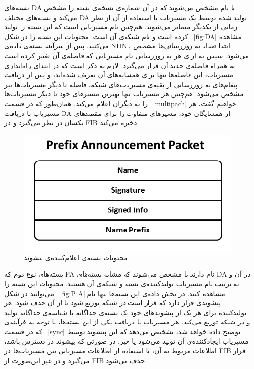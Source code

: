 بسته‌های DA با نام  مشخص می‌شوند که در آن  شماره‌ی نسخه‌ی بسته را مشخص می‌کند و بسته‌های مختلف DA تولید شده توسط یک مسیریاب با استفاده از آن از نظر زمانی از یکدیگر متمایز می‌شوند. هم‌چنین  نام مسیریابی است که این بسته را تولید کرده است و  نام شبکه‌ی آن است. محتویات این بسته را در شکل ~\ref{fig:DA} مشاهده می‌کنید. پس از سرآیند بسته‌ی داده‌ی NDN ، ابتدا تعداد به روزرسانی‌ها مشخص می‌شود. سپس به ازای هر به روزرسانی نام مسیریابی که فاصله‌ی آن تغییر کرده است به همراه فاصله‌ی جدید آن قرار می‌گیرد. لازم به ذکر است که در ابتدای راه‌اندازی مسیریاب، این فاصله‌ها تنها برای همسایه‌های آن تعریف شده‌اند، و پس از دریافت پیغام‌های به روزرسانی از بقیه‌ی مسیریاب‌های شبکه، فاصله تا دیگر مسیریاب‌ها نیز مشخص می‌شود. هم‌چنین هر مسیریاب تنها بهترین مسیرهای خود تا دیگر مسیریاب‌ها را به دیگران اعلام می‌کند. همان‌طور که در قسمت ‍~\ref{multipach} خواهیم گفت، هر مسیریاب با دریافت DA از همسایگان خود، مسیرهای متفاوت را برای مقصد‌های یکسان در نظر می‌گیرد و در FIB ذخیره می‌کند.


\begin{figure}[hb!]
\centering
\includegraphics[scale=0.6]{./resources/figures/PA.png}
\caption{محتویات بسته‌ی اعلام‌کننده‌ی پیشوند}
\label{fig:PA}
\end{figure}

بسته‌های نوع دوم که PA نام دارند با  مشخص می‌شوند که مشابه بسته‌های DA در آن  و  به ترتیب نام مسیریاب تولیدکننده‌ی بسته و شبکه‌ی آن هستند. محتویات این بسته را می‌توانید در شکل ~\ref{fig:P	A} مشاهده کنید. در بخش داده‌ی این بسته‌ها تنها نام پیشوندی قرار دارد که قرار است در شبکه توزیع شود یا از آن حذف شود. هر تولید‌کننده برای هر یک از پیشوند‌های خود یک بسته‌ی جداگانه با شناسه‌ی جداگانه تولید و در شبکه توزیع می‌کند. هر مسیریاب با دریافت یکی از این بسته‌ها، با توجه به فرآیندی که در قسمت ~\ref{sync} توضیح داده خواهد شد، تشخیص می‌دهد که این پیشوند توسط مسیریاب ایجاد‌کننده‌ی آن تولید می‌شود یا خیر. در صورتی که پیشوند در دسترس باشد، اطلاعات مربوط به آن، با استفاده از اطلاعات مسیریابی بین مسیریاب‌ها در FIB قرار می‌گیرد و در غیر این‌صورت از FIB حذف می‌شود. 



